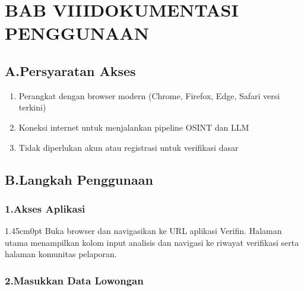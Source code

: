 \documentclass[12pt,a4paper]{article}
\begin{document}
\section*{BAB VIII\quad DOKUMENTASI PENGGUNAAN}

\subsection*{A.\quad Persyaratan Akses}

\begin{enumerate}[label=\textbf{\arabic*.}]
  \item Perangkat dengan browser modern (Chrome, Firefox, Edge, Safari versi terkini)
  \item Koneksi internet untuk menjalankan pipeline OSINT dan LLM
  \item Tidak diperlukan akun atau registrasi untuk verifikasi dasar
\end{enumerate}

\subsection*{B.\quad Langkah Penggunaan}

\subsubsection*{1.\quad Akses Aplikasi}

\begin{adjustwidth}{1.45cm}{0pt}
Buka browser dan navigasikan ke URL aplikasi Verifin. Halaman utama menampilkan kolom input analisis dan navigasi ke riwayat verifikasi serta halaman komunitas pelaporan.
\end{adjustwidth}

\subsubsection*{2.\quad Masukkan Data Lowongan}
\end{document}
